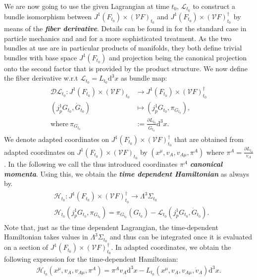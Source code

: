 \documentclass[a4paper,12pt, DIV=14, BCOR=5mm, twoside, headsepline, numbers=noenddot]{scrbook}
\begin{document}
We are now going to use the given Lagrangian at time $t_0$, $\mathcal{L}_{t_0}$ to construct a bundle isomorphism between $J^1(F_{t_0}) \times (\mathcal{V}F)_{t_0}$ and $J^1(F_{t_0}) \times (\mathcal{V}F)_{t_0}^{\dagger}$ by means of the \textit{\textbf{fiber derivative}}. Details can be found in \cite{abraham2008foundations} for the standard case in particle mechanics and \cite{2000RpMP...45...67G} and \cite{AIF_1973__23_1_203_0} for a more sophisticated treatment.
As the two bundles at use are in particular products of manifolds, they both define trivial bundles with base space $J^1(F_{t_0})$ and projection being the canonical projection onto the second factor that is provided by the product structure. We now define the fiber derivative w.r.t $\mathcal{L}_{t_0} = L_{t_0}\mathrm{d}^3x$ as bundle map:
\begin{align}
\begin{aligned}
    \mathcal{D}\mathcal{L}_{t_0} : J^1(F_{t_0}) \times (\mathcal{V}F)_{t_0} &\longrightarrow J^1(F_{t_0}) \times (\mathcal{V}F)_{t_0}^{\dagger}\\
    (j^1_pG_{t_0},\dot{G}_{t_0}) &\longmapsto (j^1_pG_{t_0},\pi_{G_{t_0}}), \\
    \text{where} \  \pi_{G_{t_0}} &:= \frac{\partial L_{t_0}}{\dot{G}_{t_0}}\mathrm{d}^3x.
\end{aligned}
\end{align}
We denote adapted coordinates on  $J^1(F_{t_0}) \times (\mathcal{V}F)_{t_0}^{\dagger}$ that are obtained from adapted coordinates on $J^1(F_{t_0}) \times (\mathcal{V}F)_{t_0}$ by $(x^\mu,v_A,v_{A\mu},\pi^A)$ where $\pi^A = \frac{\partial L_{t_0}}{v_A}$. In the following we call the thus introduced coordinates $\pi^A$ \textit{\textbf{canonical momenta}}.
Using this, we obtain the \textit{\textbf{time dependent Hamiltonian}} as always by.
\begin{align}\label{Ham}
\begin{aligned}
&\mathcal{H}_{t_0} : J^1(F_{t_0}) \times (\mathcal{V}F)_{t_0}^{\dagger} \longrightarrow \Lambda^3\Sigma_{t_0} \\
    &\mathcal{H}_{t_0}(j^1_pG_{t_0},\pi_{G_{t_0}}) = \pi_{G_{t_0}}(G_{t_0}) - \mathcal{L}_{t_0}(j^1_pG_{t_0},\dot{G}_{t_0}). 
\end{aligned}
\end{align}
Note that, just as the time dependent Lagrangian, the time-dependent Hamiltonian takes values in $\Lambda^3\Sigma_{t_0}$ and thus can be integrated once it is evaluated on a section of  $J^1(F_{t_0}) \times (\mathcal{V}F)_{t_0}^{\dagger}$.
In adapted coordinates, we obtain the following expression for the time-dependent Hamiltonian:
\begin{align}
    \mathcal{H}_{t_0}(x^\mu, v_A, v_{A\mu},\pi^A) = \pi^A v_A \mathrm{d}^3x - L_{t_0}(x^\mu,v_A,v_{A\mu},\dot{v}_A) \mathrm{d}^3x.
\end{align}
\end{document}
